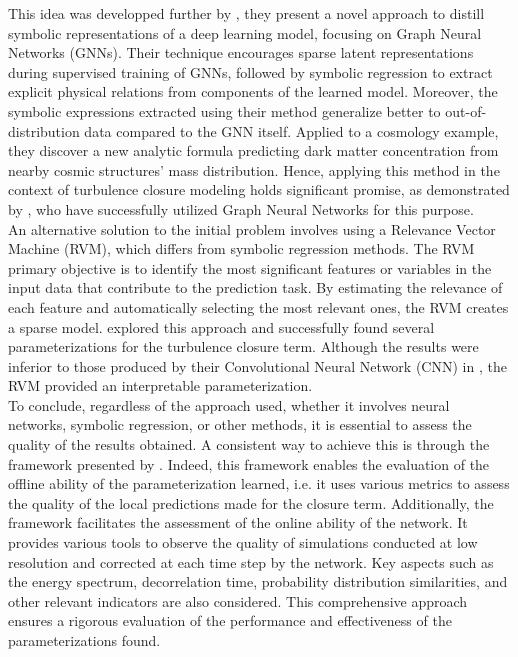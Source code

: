 This idea was developped further by \cite{PySR}, they present a novel approach to distill symbolic representations of a deep learning model, focusing on Graph Neural Networks (GNNs). Their technique encourages sparse latent representations during supervised training of GNNs, followed by symbolic regression to extract explicit physical relations from components of the learned model. Moreover, the symbolic expressions extracted using their method generalize better to out-of-distribution data compared to the GNN itself. Applied to a cosmology example, they discover a new analytic formula predicting dark matter concentration from nearby cosmic structures' mass distribution. Hence, applying this method in the context of turbulence closure modeling holds significant promise, as demonstrated by \cite{ClosureGNN}, who have successfully utilized Graph Neural Networks for this purpose.\\

An alternative solution to the initial problem involves using a Relevance Vector Machine (RVM), which differs from symbolic regression methods. The RVM primary objective is to identify the most significant features or variables in the input data that contribute to the prediction task. By estimating the relevance of each feature and automatically selecting the most relevant ones, the RVM creates a sparse model. \cite{ClosureDataDrivenZanna} explored this approach and successfully found several parameterizations for the turbulence closure term. Although the results were inferior to those produced by their Convolutional Neural Network (CNN) in \cite{FCNN1}, the RVM provided an interpretable parameterization.\\

To conclude, regardless of the approach used, whether it involves neural networks, symbolic regression, or other methods, it is essential to assess the quality of the results obtained. A consistent way to achieve this is through the framework presented by \cite{Benchmarking}. Indeed, this framework enables the evaluation of the offline ability of the parameterization learned, i.e. it uses various metrics to assess the quality of the local predictions made for the closure term. Additionally, the framework facilitates the assessment of the online ability of the network. It provides various tools to observe the quality of simulations conducted at low resolution and corrected at each time step by the network. Key aspects such as the energy spectrum, decorrelation time, probability distribution similarities, and other relevant indicators are also considered. This comprehensive approach ensures a rigorous evaluation of the performance and effectiveness of the parameterizations found.

